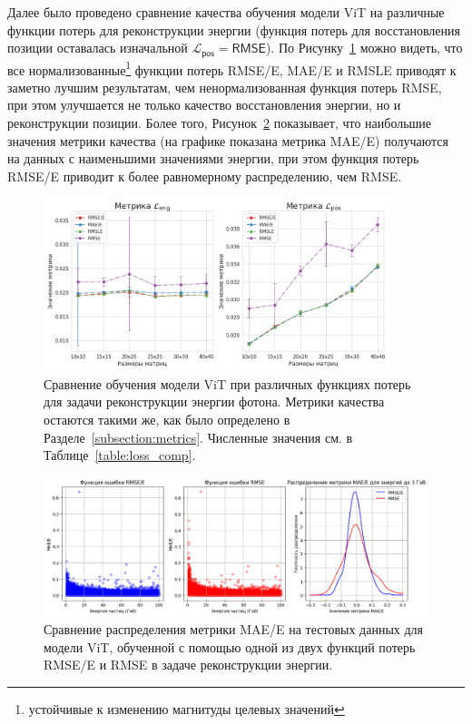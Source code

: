 \documentclass[a4paper,12pt]{extarticle}
\begin{document}
Далее было проведено сравнение качества обучения модели \textsf{ViT} на различные функции потерь для реконструкции энергии (функция потерь для восстановления позиции оставалась изначальной $\mathcal{L}_{\textsf{pos}} = \textsf{RMSE}$). По Рисунку~\ref{graph:loss_comp} можно видеть, что все нормализованные\footnote{устойчивые к изменению магнитуды целевых значений} функции потерь \textsf{RMSE/E}, \textsf{MAE/E} и \textsf{RMSLE} приводят к заметно лучшим результатам, чем ненормализованная функция потерь \textsf{RMSE}, при этом улучшается не только качество восстановления энергии, но и реконструкции позиции. Более того, Рисунок~\ref{graph:loss_distr} показывает, что наибольшие значения метрики качества (на графике показана метрика \textsf{MAE/E}) получаются на данных с наименьшими значениями энергии, при этом функция потерь \textsf{RMSE/E} приводит к более равномерному распределению, чем \textsf{RMSE}.

\begin{figure}[t]
    \centering
    \includegraphics[width=0.9\textwidth]{graphics/loss_comp.png}
    \caption{Сравнение обучения модели \textsf{ViT} при различных функциях потерь для задачи реконструкции энергии фотона. Метрики качества остаются такими же, как было определено в Разделе~\ref{subsection:metrics}. Численные значения см. в Таблице~\ref{table:loss_comp}.}
    \label{graph:loss_comp}
\end{figure}

\begin{figure}[t]
    \centering
    \includegraphics[width=1.0\textwidth]{graphics/exp2_distr_comp.png}
    \caption{Сравнение распределения метрики \textsf{MAE/E} на тестовых данных для модели \textsf{ViT}, обученной с помощью одной из двух функций потерь \textsf{RMSE/E} и \textsf{RMSE} в задаче реконструкции энергии.}
    \label{graph:loss_distr}
\end{figure}
\end{document}

